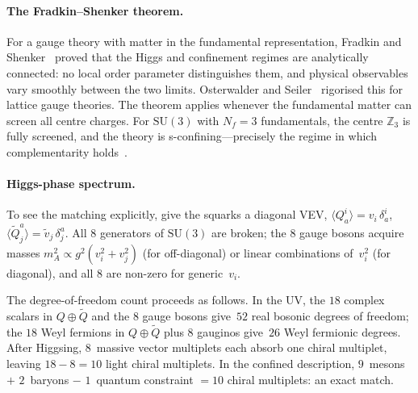 \documentclass[12pt,a4paper]{article}
\newcommand{\SU}{\mathrm{SU}}
\newcommand{\Nf}{N_f}
\begin{document}
\paragraph{The Fradkin--Shenker theorem.}
For a gauge theory with matter in the fundamental representation,
Fradkin and Shenker~\cite{FradkinShenker:1979} proved that the
Higgs and confinement regimes are analytically connected: no
local order parameter distinguishes them, and physical observables
vary smoothly between the two limits.  Osterwalder and
Seiler~\cite{OsterwalderSeiler:1978} rigorised this for lattice
gauge theories.  The theorem applies whenever the fundamental
matter can screen all centre charges.  For $\SU(3)$ with $\Nf = 3$
fundamentals, the centre $\mathbb{Z}_3$ is fully screened, and the
theory is s-confining---precisely the regime in which complementarity
holds~\cite{Acharya:2025}.

\paragraph{Higgs-phase spectrum.}
To see the matching explicitly, give the squarks a diagonal VEV,
$\langle Q^i_a \rangle = v_i\,\delta^i_a$,
$\langle \tilde{Q}^a_j \rangle = \tilde{v}_j\,\delta^a_j$.
All 8 generators of $\SU(3)$ are broken; the 8 gauge bosons acquire
masses $m_A^2 \propto g^2(v_i^2 + v_j^2)$ (for off-diagonal) or
linear combinations of~$v_i^2$ (for diagonal), and all 8 are
non-zero for generic~$v_i$.

The degree-of-freedom count proceeds as follows.  In the UV, the
$18$ complex scalars in $Q \oplus \tilde{Q}$ and the $8$ gauge
bosons give~$52$ real bosonic degrees of freedom; the $18$ Weyl
fermions in $Q \oplus \tilde{Q}$ plus $8$ gauginos give~$26$ Weyl
fermionic degrees.  After Higgsing, $8$~massive vector multiplets
each absorb one chiral multiplet, leaving
$18 - 8 = 10$ light chiral multiplets.  In the confined description,
$9$~mesons $+$ $2$~baryons $-$ $1$~quantum constraint
$= 10$ chiral multiplets: an exact match.
\end{document}

